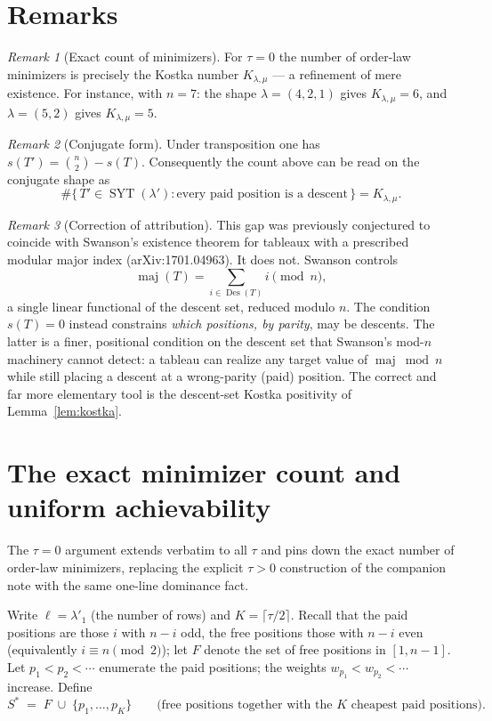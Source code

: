 \documentclass[11pt]{article}
\theoremstyle{remark}
\newtheorem{remark}{Remark}
\newcommand{\Des}{\operatorname{Des}}
\newcommand{\SYT}{\operatorname{SYT}}
\newcommand{\maj}{\operatorname{maj}}
\begin{document}
\section{Remarks}

\begin{remark}[Exact count of minimizers]
For $\tau=0$ the number of order-law minimizers is precisely the Kostka number $K_{\lambda,\mu}$ --- a refinement of mere existence. For instance, with $n=7$: the shape $\lambda=(4,2,1)$ gives $K_{\lambda,\mu}=6$, and $\lambda=(5,2)$ gives $K_{\lambda,\mu}=5$.
\end{remark}

\begin{remark}[Conjugate form]
Under transposition one has $s(T')=\binom{n}{2}-s(T)$. Consequently the count above can be read on the conjugate shape as
\[
\#\{\,T'\in\SYT(\lambda'): \text{every paid position is a descent}\,\}=K_{\lambda,\mu}.
\]
\end{remark}

\begin{remark}[Correction of attribution]
This gap was previously conjectured to coincide with Swanson's existence theorem for tableaux with a prescribed modular major index (arXiv:1701.04963). It does not. Swanson controls
\[
\maj(T)=\sum_{i\in\Des(T)} i \pmod{n},
\]
a single linear functional of the descent set, reduced modulo $n$. The condition $s(T)=0$ instead constrains \emph{which positions, by parity}, may be descents. The latter is a finer, positional condition on the descent set that Swanson's mod-$n$ machinery cannot detect: a tableau can realize any target value of $\maj\bmod n$ while still placing a descent at a wrong-parity (paid) position. The correct and far more elementary tool is the descent-set Kostka positivity of Lemma~\ref{lem:kostka}.
\end{remark}

\section{The exact minimizer count and uniform achievability}

The $\tau=0$ argument extends verbatim to all $\tau$ and pins down the exact number of order-law minimizers, replacing the explicit $\tau>0$ construction of the companion note with the same one-line dominance fact.

Write $\ell=\lambda'_1$ (the number of rows) and $K=\lceil\tau/2\rceil$. Recall that the paid positions are those $i$ with $n-i$ odd, the free positions those with $n-i$ even (equivalently $i\equiv n\pmod 2$); let $F$ denote the set of free positions in $[1,n-1]$. Let $p_1<p_2<\cdots$ enumerate the paid positions; the weights $w_{p_1}<w_{p_2}<\cdots$ increase. Define
\[
S^{*} \;=\; F \;\cup\; \{p_1,\dots,p_K\} \qquad\text{(free positions together with the $K$ cheapest paid positions).}
\]
\end{document}
